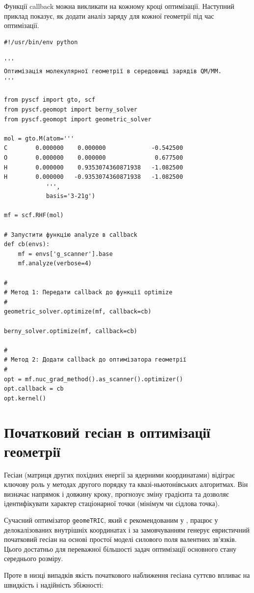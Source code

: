 Функції callback можна викликати на кожному кроці оптимізації. Наступний приклад показує, як додати аналіз заряду для кожної геометрії під час оптимізації.

\begin{verbatim}
#!/usr/bin/env python

'''
Оптимізація молекулярної геометрії в середовищі зарядів QM/MM.
'''

from pyscf import gto, scf
from pyscf.geomopt import berny_solver
from pyscf.geomopt import geometric_solver

mol = gto.M(atom='''
C        0.000000    0.000000             -0.542500
O        0.000000    0.000000              0.677500
H        0.000000    0.9353074360871938   -1.082500
H        0.000000   -0.9353074360871938   -1.082500
            ''',
            basis='3-21g')

mf = scf.RHF(mol)

# Запустити функцію analyze в callback
def cb(envs):
    mf = envs['g_scanner'].base
    mf.analyze(verbose=4)

#
# Метод 1: Передати callback до функції optimize
#
geometric_solver.optimize(mf, callback=cb)

berny_solver.optimize(mf, callback=cb)

#
# Метод 2: Додати callback до оптимізатора геометрії
#
opt = mf.nuc_grad_method().as_scanner().optimizer()
opt.callback = cb
opt.kernel()
\end{verbatim}


\section{Початковий гесіан в оптимізації геометрії}

Гесіан (матриця других похідних енергії за ядерними координатами) відіграє ключову роль у методах другого порядку та квазі-ньютонівських алгоритмах. Він визначає напрямок і довжину кроку, прогнозує зміну градієнта та дозволяє ідентифікувати характер стаціонарної точки (мінімум чи сідлова точка).

Сучасний оптимізатор \texttt{geomeTRIC}, який є рекомендованим у \PySCF{}, працює у делокалізованих внутрішніх координатах і за замовчуванням генерує евристичний початковий гесіан на основі простої моделі силового поля валентних зв’язків. Цього достатньо для переважної більшості задач оптимізації основного стану середнього розміру.

Проте в низці випадків якість початкового наближення гесіана суттєво впливає на швидкість і надійність збіжності:

